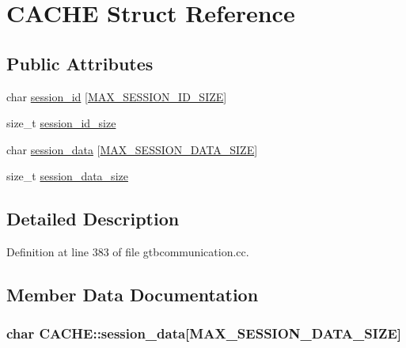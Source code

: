 \hypertarget{structCACHE}{\section{C\-A\-C\-H\-E Struct Reference}
\label{structCACHE}
}
\subsection*{Public Attributes}
\begin{DoxyCompactItemize}
\item 
char \hyperlink{structCACHE_a546945d83f3c1401f06d1cfdf5107689}{session\-\_\-id} \mbox{[}\hyperlink{gtbcommunication_8cc_adce962b5553591d36b5e51bdc06ec2eb}{M\-A\-X\-\_\-\-S\-E\-S\-S\-I\-O\-N\-\_\-\-I\-D\-\_\-\-S\-I\-Z\-E}\mbox{]}
\item 
size\-\_\-t \hyperlink{structCACHE_ad06d74c3164389ccc45261443bafc460}{session\-\_\-id\-\_\-size}
\item 
char \hyperlink{structCACHE_a92a4c57e09f7d5e310256f044cf152a8}{session\-\_\-data} \mbox{[}\hyperlink{gtbcommunication_8cc_a235acd5aaa5caea1f0ec56b02e1ba2ea}{M\-A\-X\-\_\-\-S\-E\-S\-S\-I\-O\-N\-\_\-\-D\-A\-T\-A\-\_\-\-S\-I\-Z\-E}\mbox{]}
\item 
size\-\_\-t \hyperlink{structCACHE_ab8dfd4baa14b034eaedad34115ad06f5}{session\-\_\-data\-\_\-size}
\end{DoxyCompactItemize}


\subsection{Detailed Description}


Definition at line 383 of file gtbcommunication.\-cc.



\subsection{Member Data Documentation}
\hypertarget{structCACHE_a92a4c57e09f7d5e310256f044cf152a8}{
\subsubsection[{session\-\_\-data}]{\setlength{\rightskip}{0pt plus 5cm}char C\-A\-C\-H\-E\-::session\-\_\-data\mbox{[}{\bf M\-A\-X\-\_\-\-S\-E\-S\-S\-I\-O\-N\-\_\-\-D\-A\-T\-A\-\_\-\-S\-I\-Z\-E}\mbox{]}}}\label{structCACHE_a92a4c57e09f7d5e310256f044cf152a8}


